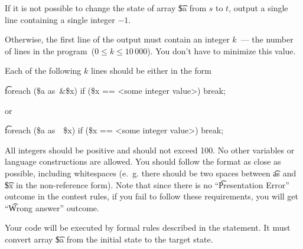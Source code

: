 If it is not possible to change the state of array \t{\$a} from $s$ to $t$, output a single line containing a single integer $-1$. 

Otherwise, the first line of the output must contain an integer $k$~--- the number of lines in the program~($0 \le k \le 10\,000$). You don't have to minimize this value.

Each of the following $k$ lines should be either in the form

\begin{center} 
\t{foreach (\$a as~\&\$x) if (\$x == <some integer value>) break;}
\end{center}

or 

\begin{center} 
\t{foreach (\$a as~~\$x) if (\$x == <some integer value>) break;}
\end{center}

All integers should be positive and should not exceed 100. No other variables or language constructions are allowed. You should follow the format as close as possible, including whitespaces (e.~g. there should be two spaces between \t{as} and \t{\$x} in the non-reference form). Note that since there is no ``\t{Presentation Error}'' outcome in the contest rules, if you fail to follow these requirements, you will get ``\t{Wrong answer}'' outcome.

Your code will be executed by formal rules described in the statement. It must convert array \t{\$a} from the initial state to the target state.